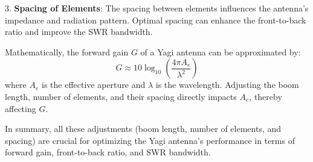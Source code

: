 3. \textbf{Spacing of Elements}: The spacing between elements influences the antenna's impedance and radiation pattern. Optimal spacing can enhance the front-to-back ratio and improve the SWR bandwidth.

Mathematically, the forward gain \( G \) of a Yagi antenna can be approximated by:
\[ G \approx 10 \log_{10} \left( \frac{4\pi A_e}{\lambda^2} \right) \]
where \( A_e \) is the effective aperture and \( \lambda \) is the wavelength. Adjusting the boom length, number of elements, and their spacing directly impacts \( A_e \), thereby affecting \( G \).

In summary, all these adjustments (boom length, number of elements, and spacing) are crucial for optimizing the Yagi antenna's performance in terms of forward gain, front-to-back ratio, and SWR bandwidth.

